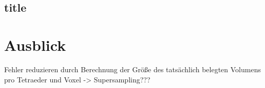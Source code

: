 \documentclass[a4paper,fontsize=12pt,toc=bib,halfparskip]{scrartcl}
\begin{document}
\subsection{title}
\section{Ausblick}
\label{sec:Ausblick}
Fehler reduzieren durch Berechnung der Gr\"o{\ss}e des tats\"achlich belegten Volumens pro Tetraeder und Voxel -> Supersampling???

\label{LastPageBeforeRefs}
\clearpage
{}

\printbibliography[type=book,title={Bücher}]
\printbibliography[filter=papers,title={Artikel}]
\printbibliography[type=online,title={Internetressourcen}]
\label{LastBibPage}
\end{document}
